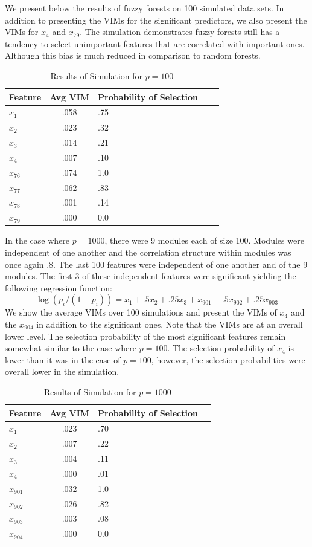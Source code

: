 \documentclass[article,shortnames]{jss}
\begin{document}
We present below the results of fuzzy forests on 100 simulated data sets.  In addition to presenting the VIMs
for the significant predictors, we also present the VIMs for $x_{4}$ and $x_{79}$.  The simulation 
demonstrates fuzzy forests still has a tendency to select unimportant features that are correlated with important 
ones.   Although this bias is much reduced in comparison to random forests.
\begin{table}[hc]
\centering
\caption{Results of Simulation for $p=100$}
\begin{tabular}{lclcl}
Feature&Avg VIM& Probability of Selection\\
\hline
$x_{1}$  & .058 &  .75\\
$x_{2}$  & .023 &  .32\\
$x_{3}$  & .014 &  .21\\
$x_{4}$ & .007 &  .10\\
$x_{76}$ & .074 & 1.0\\
$x_{77}$ & .062 & .83 \\
$x_{78}$ & .001 & .14 \\
$x_{79}$ & .000 & 0.0
\end{tabular}
\end{table}

In the case where $p=1000$, there were 9 modules each of size 100.  Modules were independent of one
another and the correlation structure within modules was  once again .8.  The last 100 features were independent
of one another and of the 9 modules.  The first 3 of these independent features were significant yielding the following
regression function:
\begin{equation}
\log(p_{i}/(1-p_{i})) = x_{1} + .5x_{2} + .25x_{3} + x_{901} + .5x_{902} + .25x_{903}
\end{equation}
We show the average VIMs over 100 simulations and present the VIMs of $x_{4}$ and the $x_{904}$ in
addition to the significant ones. Note that the VIMs are at an overall lower level.  The selection probability 
of the most significant features remain somewhat similar to the case where $p=100$.  The selection 
probability of $x_{4}$ is lower than it was in the case of $p=100$, however, the selection probabilities
were overall lower in the simulation.
\begin{table}[hc]
\centering
\caption{Results of Simulation for $p=1000$}
\begin{tabular}{lclc|}
Feature & Avg VIM & Probability of Selection\\
\hline
$x_{1}$  & .023 & .70\\  
$x_{2}$  & .007 & .22\\
$x_{3}$ & .004 &  .11\\
$x_{4}$  & .000 &  .01\\
$x_{901}$ & .032 & 1.0\\
$x_{902}$ & .026 & .82\\
$x_{903}$ & .003 & .08\\
$x_{904}$ & .000 & 0.0
\end{tabular}
\end{table}
\end{document}

